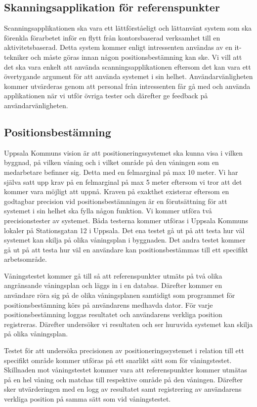\documentclass[a4paper,12pt]{article}
\begin{document}
 \subsection{Skanningsapplikation för referenspunkter}
 Scanningsapplikationen ska vara ett lättförståeligt och lättanvänt system som ska förenkla förarbetet inför en flytt från kontorsbaserad verksamhet till en aktivitetsbaserad. Detta system kommer enligt intressenten användas av en it-tekniker och måste göras innan någon positionsbestämning kan ske. Vi vill att det ska vara enkelt att använda scanningsapplikationen eftersom det kan vara ett övertygande argument för att använda systemet i sin helhet. Användarvänligheten kommer utvärderas genom att personal från intressenten får gå med och använda applikationen när vi utför övriga tester och därefter ge feedback på användarvänligheten.


 \subsection{Positionsbestämning}
 Uppsala Kommuns vision är att positioneringssystemet ska kunna visa i vilken byggnad, på vilken våning och i vilket område på den våningen som en medarbetare befinner sig. Detta med en felmarginal på max 10 meter. Vi har själva satt upp krav på en felmarginal på max 5 meter eftersom vi tror att det kommer vara möjligt att uppnå. Kraven på exakthet existerar eftersom en godtagbar precision vid positionsbestämningen är en förutsättning för att systemet i sin helhet ska fylla någon funktion. Vi kommer utföra två precisionstester av systemet. Båda testerna kommer utföras i Uppsala Kommuns lokaler på Stationsgatan 12 i Uppsala. Det ena testet gå ut på att testa hur väl systemet kan skilja på olika våningsplan i byggnaden. Det andra testet kommer gå ut på att testa hur väl en användare kan positionsbestämmas till ett specifikt arbetsområde.

 Våningstestet kommer gå till så att referenspunkter utmäts på två olika angränsande våningsplan och läggs in i en databas. Därefter kommer en användare röra sig på de olika våningsplanen samtidigt som programmet för positionsbestämning körs på användarens medhavda dator. För varje positionsbestämning loggas resultatet och användarens verkliga position registreras. Därefter undersöker vi resultaten och ser huruvida systemet kan skilja på olika våningsplan.

 Testet för att undersöka precisionen av positioneringssystemet i relation till ett specifikt område kommer utföras på ett snarlikt sätt som för våningstestet. Skillnaden mot våningstestet kommer vara att referenspunkter kommer utmätas på en hel våning och matchas till respektive område på den våningen. Därefter sker utvärderingen med en logg av resultatet samt registrering av användarens verkliga position på samma sätt som vid våningstestet.
\end{document}
